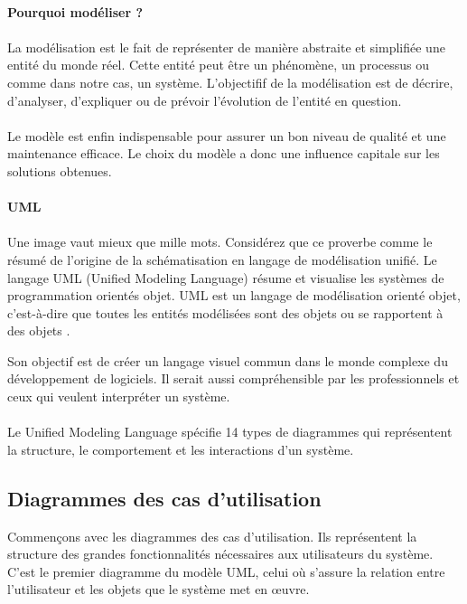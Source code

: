 
\paragraph{Pourquoi modéliser ?}
\paragraph{}
La modélisation est le fait de représenter de manière abstraite et simplifiée
une entité du monde réel. Cette entité peut être un phénomène, un processus ou 
comme dans notre cas, un système. L'objectifif de la modélisation est de décrire,
d'analyser, d'expliquer ou de prévoir l'évolution de l'entité en question.
\paragraph{}
Le modèle est enfin indispensable pour assurer un bon niveau de qualité 
et une maintenance efficace. Le choix du modèle a donc une influence capitale 
sur les solutions obtenues.
\paragraph{UML}
\paragraph{}
Une image vaut mieux que mille mots.
Considérez que ce proverbe comme le résumé de l'origine
de la schématisation en langage de modélisation unifié.
Le langage UML (Unified Modeling Language) résume et visualise les 
systèmes de programmation orientés objet. UML est un langage de 
modélisation orienté objet, c’est-à-dire que toutes 
les entités modélisées sont des objets ou se rapportent à des 
objets \cite{conan}.

Son objectif est de créer un langage visuel commun dans le monde 
complexe du développement de logiciels. Il serait aussi compréhensible
par les professionnels et ceux qui veulent interpréter un système. 
\paragraph{}
Le Unified Modeling Language spécifie 14 types de 
diagrammes qui représentent la structure, le comportement et les interactions d’un système.
\subsection{Diagrammes des cas d'utilisation}
Commençons avec les diagrammes des cas d'utilisation. Ils représentent 
la structure des grandes fonctionnalités nécessaires 
aux utilisateurs du système. C'est le premier diagramme du modèle UML, celui où s'assure la 
relation entre l'utilisateur et les objets que le système met en œuvre\cite{audibert2009uml}.
